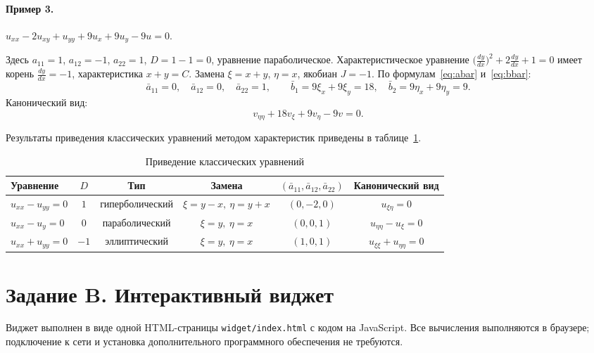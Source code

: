 \documentclass[a4paper,12pt]{article}
\begin{document}
\paragraph{Пример 3.} $u_{xx}-2u_{xy}+u_{yy}+9u_x+9u_y-9u=0$.

Здесь $a_{11}=1$, $a_{12}=-1$, $a_{22}=1$, $D=1-1=0$, уравнение параболическое.
Характеристическое уравнение
$\bigl(\frac{dy}{dx}\bigr)^2+2\frac{dy}{dx}+1=0$ имеет корень $\frac{dy}{dx}=-1$,
характеристика $x+y=C$. Замена $\xi=x+y$, $\eta=x$, якобиан $J=-1$.
По формулам~\eqref{eq:abar} и~\eqref{eq:bbar}:
\[
  \bar a_{11}=0,\quad \bar a_{12}=0,\quad \bar a_{22}=1,\qquad
  \bar b_1=9\xi_x+9\xi_y=18,\quad \bar b_2=9\eta_x+9\eta_y=9.
\]
Канонический вид:
\[
  v_{\eta\eta}+18v_\xi+9v_\eta-9v=0.
\]

Результаты приведения классических уравнений методом характеристик приведены
в таблице~\ref{tab:classic}.

\begin{table}[H]
\centering\small
\renewcommand{\arraystretch}{1.3}
\setlength{\tabcolsep}{4pt}
\caption{Приведение классических уравнений}
\label{tab:classic}
\begin{tabular}{@{}lccccc@{}}
\toprule
Уравнение & $D$ & Тип & Замена & $(\bar a_{11},\bar a_{12},\bar a_{22})$ & Канонический вид\\
\midrule
$u_{xx}-u_{yy}=0$ & $1$  & гиперболический & $\xi=y-x,\ \eta=y+x$ & $(0,-2,0)$ & $u_{\xi\eta}=0$\\
$u_{xx}-u_{y}=0$  & $0$  & параболический  & $\xi=y,\ \eta=x$     & $(0,0,1)$  & $u_{\eta\eta}-u_\xi=0$\\
$u_{xx}+u_{yy}=0$ & $-1$ & эллиптический   & $\xi=y,\ \eta=x$     & $(1,0,1)$  & $u_{\xi\xi}+u_{\eta\eta}=0$\\
\bottomrule
\end{tabular}
\end{table}

\section{Задание B. Интерактивный виджет}

Виджет выполнен в виде одной HTML-страницы \texttt{widget/index.html} с кодом на
JavaScript. Все вычисления выполняются в браузере; подключение к сети и установка
дополнительного программного обеспечения не требуются.
\end{document}

